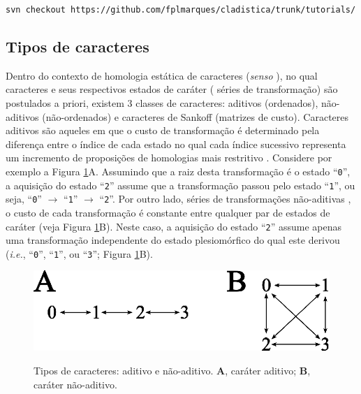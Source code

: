 \begin{center}
\small \texttt{svn checkout https://github.com/fplmarques/cladistica/trunk/tutorials/}\\
\end{center}




\newpage
\pagestyle{fancy} %
\begin{refsection}
\renewcommand*{\finalnamedelim}{\addspace\&\space}%

\section{Tipos de caracteres}\label{tut6:chartypes}

Dentro do contexto de homologia estática de caracteres (\textit{senso} \textcite{Wheeler_2001}), no qual caracteres e seus respectivos estados de caráter (\ie{~} séries de transformação) são postulados a priori, existem 3 classes de caracteres: aditivos (ordenados), não-aditivos (não-ordenados) e caracteres de Sankoff (matrizes de custo). Caracteres aditivos \parencite{Farris_1970} são aqueles em que o custo de transformação é determinado pela diferença entre o índice de cada estado no qual cada índice sucessivo representa um incremento de proposições de homologias mais restritivo \parencite{wheeler_2012}. Considere por exemplo a Figura \ref{tut6:fig:chartypes}A. Assumindo que a raiz desta transformação é o estado ``\texttt{0}'', a aquisição do estado ``\texttt{2}'' assume que a transformação passou pelo estado ``\texttt{1}'', ou seja, ``\texttt{0}'' $\rightarrow$ ``\texttt{1}'' $\rightarrow$ ``\texttt{2}''. Por outro lado, séries de transformações não-aditivas \parencite[][]{Fitch_1971}, o custo de cada transformação é constante entre qualquer par de estados de caráter (veja  Figura \ref{tut6:fig:chartypes}B). Neste caso, a aquisição do estado ``\texttt{2}'' assume apenas uma transformação independente do estado plesiomórfico do qual este derivou (\textit{i.e.}, ``\texttt{0}'', ``\texttt{1}'', ou ``\texttt{3}''; Figura \ref{tut6:fig:chartypes}B).\\

  \begin{figure}[H]
       \centering
      {\includegraphics[scale=1.00]{figures/tut6/character_types.eps}}
	{\caption[Tipos de caracteres: aditivo e não-aditivo]{Tipos de caracteres: aditivo e não-aditivo. \textbf{A}, caráter aditivo; \textbf{B}, caráter não-aditivo.}\label{tut6:fig:chartypes}}
  \end{figure}


\end{refsection}
